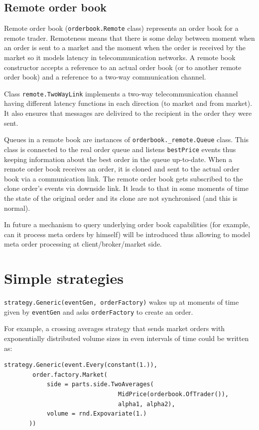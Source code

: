 \documentclass[a4paper,11pt]{article}
\begin{document}
\subsection{Remote order book}\label{remote-order-book}

Remote order book (\texttt{orderbook.Remote} class) represents an order
book for a remote trader. Remoteness means that there is some delay
between moment when an order is sent to a market and the moment when the
order is received by the market so it models latency in
telecommunication networks. A remote book constructor accepts a
reference to an actual order book (or to another remote order book) and
a reference to a two-way communication channel.

Class \texttt{remote.TwoWayLink} implements a two-way telecommunication
channel having different latency functions in each direction (to market
and from market). It also ensures that messages are delivired to the
recipient in the order they were sent.

Queues in a remote book are instances of
\texttt{orderbook.\_remote.Queue} class. This class is connected to the
real order queue and listens \texttt{bestPrice} events thus keeping
information about the best order in the queue up-to-date. When a remote
order book receives an order, it is cloned and sent to the actual order
book via a communication link. The remote order book gets subscribed to
the clone order's events via downside link. It leads to that in some
moments of time the state of the original order and its clone are not
synchronised (and this is normal).

In future a mechanism to query underlying order book capabilities (for
example, can it process meta orders by himself) will be introduced thus
allowing to model meta order processing at client/broker/market side.

\section{Simple strategies}\label{simple-strategies}

\texttt{strategy.Generic(eventGen, orderFactory)} wakes up at moments of time
given by \texttt{eventGen} and asks \texttt{orderFactory} to create an
order.

For example, a crossing averages strategy that sends market orders with
exponentially distributed volume sizes in even intervals of time could
be written as:

\begin{verbatim}
strategy.Generic(event.Every(constant(1.)),
        order.factory.Market(
            side = parts.side.TwoAverages(
                                MidPrice(orderbook.OfTrader()),
                                alpha1, alpha2),
            volume = rnd.Expovariate(1.)
       ))
\end{verbatim}
\end{document}
